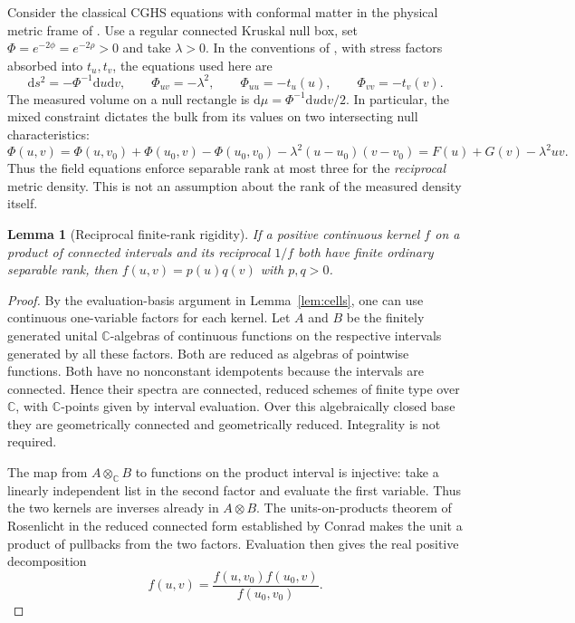 \documentclass[11pt,letterpaper]{article}
\newtheorem{lemma}[theorem]{Lemma}
\newcommand{\dd}{\mathrm{d}}
\begin{document}
Consider the classical CGHS equations with conformal matter in the physical metric frame of \cite{CGHS}. Use a regular connected Kruskal null box, set $\Phi=e^{-2\phi}=e^{-2\rho}>0$ and take $\lambda>0$. In the conventions of \cite[eqs.~(10)--(13)]{CGHS}, with stress factors absorbed into $t_u,t_v$, the equations used here are
\begin{equation}
 \dd s^2=-\Phi^{-1}\dd u\dd v,\qquad
 \Phi_{uv}=-\lambda^2,\qquad
 \Phi_{uu}=-t_u(u),\qquad \Phi_{vv}=-t_v(v).
 \label{eq:cghs}
\end{equation}
The measured volume on a null rectangle is $\dd\mu=\Phi^{-1}\dd u\dd v/2$. In particular, the mixed constraint dictates the bulk from its values on two intersecting null characteristics:
\begin{equation}
 \Phi(u,v)=\Phi(u,v_0)+\Phi(u_0,v)-\Phi(u_0,v_0)
    -\lambda^2(u-u_0)(v-v_0)
   =F(u)+G(v)-\lambda^2uv .
 \label{eq:datum}
\end{equation}
Thus the field equations enforce separable rank at most three for the \emph{reciprocal} metric density. This is not an assumption about the rank of the measured density itself.

\begin{lemma}[Reciprocal finite-rank rigidity]\label{lem:recip}
If a positive continuous kernel $f$ on a product of connected intervals and its reciprocal $1/f$ both have finite ordinary separable rank, then $f(u,v)=p(u)q(v)$ with $p,q>0$.
\end{lemma}
\begin{proof}
By the evaluation-basis argument in Lemma~\ref{lem:cells}, one can use continuous one-variable factors for each kernel. Let $A$ and $B$ be the finitely generated unital $\mathbb C$-algebras of continuous functions on the respective intervals generated by all these factors. Both are reduced as algebras of pointwise functions. Both have no nonconstant idempotents because the intervals are connected. Hence their spectra are connected, reduced schemes of finite type over $\mathbb C$, with $\mathbb C$-points given by interval evaluation. Over this algebraically closed base they are geometrically connected and geometrically reduced. Integrality is not required.

The map from $A\otimes_{\mathbb C}B$ to functions on the product interval is injective: take a linearly independent list in the second factor and evaluate the first variable. Thus the two kernels are inverses already in $A\otimes B$. The units-on-products theorem of Rosenlicht in the reduced connected form established by Conrad \cite[Theorem~1.1]{Conrad} makes the unit a product of pullbacks from the two factors. Evaluation then gives the real positive decomposition
\[
 f(u,v)=\frac{f(u,v_0)f(u_0,v)}{f(u_0,v_0)} .
\]
\end{proof}
\end{document}
